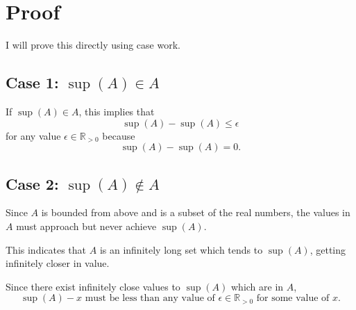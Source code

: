 \documentclass[12pt,oneside]{article}
\theoremstyle{definition}
\begin{document}
\section*{Proof}
I will prove this directly using case work.

\subsection*{Case 1: \( \sup(A) \in A \)}
If \( \sup(A) \in A \), this implies that 
\[
\sup(A) - \sup(A) \leq \epsilon
\]
for any value \( \epsilon \in \mathbb{R}_{>0} \) because
\[
\sup(A) - \sup(A) = 0.
\]

\subsection*{Case 2: \( \sup(A) \notin A \)}
Since \( A \) is bounded from above and is a subset of the real numbers, the values in \( A \) must approach but never achieve \( \sup(A) \). 

This indicates that \( A \) is an infinitely long set which tends to \( \sup(A) \), getting infinitely closer in value.

Since there exist infinitely close values to \( \sup(A) \) which are in \( A \),
\[
\sup(A) - x \text{ must be less than any value of } \epsilon \in \mathbb{R}_{>0} \text{ for some value of } x.
\]
\end{document}
